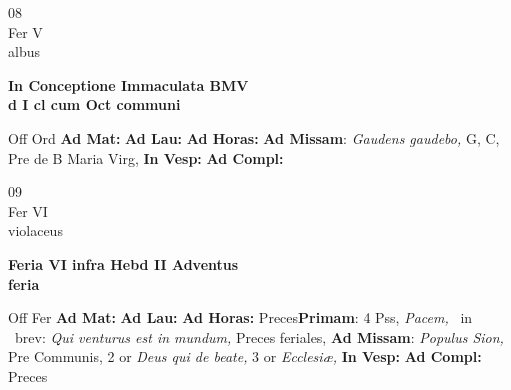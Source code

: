 \documentclass[10pt, openany]{book}
\begin{document}
        \begin{center}
            \begin{minipage}{3.5in}
                \vspace{2em}
                \begin{minipage}{0.5in}
                    {\Huge 08} \\
                    {\normalsize Fer V} \\
                    {\normalsize albus}
                \end{minipage}
                \begin{minipage}{3.0in}
                    \textbf{ \large In Conceptione Immaculata BMV \\
                    \textnormal{\normalsize d I cl cum Oct communi}} \\ 
                \end{minipage}
                \begin{justify}Off Ord
                    \textbf{Ad Mat: }
                    \textbf{Ad Lau: }
                    \textbf{Ad Horas: }\textbf{Ad Missam}: \textit{Gaudens gaudebo,} G, C, Pre de B Maria Virg,  
                    \textbf{In Vesp: }
                    \textbf{Ad Compl: }
                \end{justify}
            \end{minipage}
        \end{center}
    
        \begin{center}
            \begin{minipage}{3.5in}
                \vspace{2em}
                \begin{minipage}{0.5in}
                    {\Huge 09} \\
                    {\normalsize Fer VI} \\
                    {\normalsize violaceus}
                \end{minipage}
                \begin{minipage}{3.0in}
                    \textbf{ \large Feria VI infra Hebd II Adventus \\
                    \textnormal{\normalsize feria}} \\ 
                \end{minipage}
                \begin{justify}Off Fer
                    \textbf{Ad Mat: }
                    \textbf{Ad Lau: }
                    \textbf{Ad Horas: }Preces\textbf{Primam}: 4 Pss, \textit{Pacem,} \Vbar\ in \Rbar\ brev: \textit{Qui venturus est in mundum,} Preces feriales, \textbf{Ad Missam}: \textit{Populus Sion,} Pre Communis, 2 or \textit{Deus qui de beate,} 3 or \textit{Ecclesiæ,}  
                    \textbf{In Vesp: }
                    \textbf{Ad Compl: }Preces
                \end{justify}
            \end{minipage}
        \end{center}
    
\end{document}
